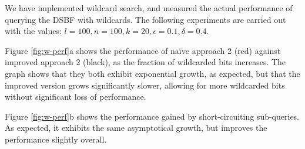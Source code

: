 \documentclass[a4paper,11pt]{article}
\begin{document}
We have implemented wildcard search, and measured the actual performance of querying the DSBF with wildcards. The following experiments are carried out with the values: $l = 100, n = 100, k = 20, \epsilon=0.1, \delta=0.4$.

Figure \ref{fig:w-perf}a shows the performance of naïve approach 2 (red) against improved approach 2 (black), as the fraction of wildcarded bits increases. The graph shows that they both exhibit exponential growth, as expected, but that the improved version grows significantly slower, allowing for more wildcarded bits without significant loss of performance.

Figure \ref{fig:w-perf}b shows the performance gained by short-circuiting sub-queries. As expected, it exhibits the same asymptotical growth, but improves the performance slightly overall.
\end{document}
